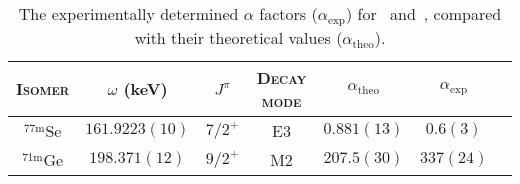 \begin{table}[hbt]
  \centering
  \caption{The experimentally determined $\alpha$ factors ($\alpha_{\mathrm{exp}}$) for \, and \,, compared with their theoretical values ($\alpha_{\mathrm{theo}}$).}
  \label{tab:chap3:bareresults}
  \begin{tabular}{ccccccc}
  \toprule
  \toprule
  \textsc{Isomer} & $\omega$ (keV) & $J^{\pi}$  & \textsc{Decay mode} & $\alpha_{\mathrm{theo}}$ & $\alpha_{\mathrm{exp}}$ \\ 
  \midrule\midrule
  $^{77\mathrm{m}}\mathrm{Se}$ & $161.9223(10)$ & $7/2 ^+$   & E3 & $0.881(13)$ & $0.6(3) $\\
  $^{71\mathrm{m}}\mathrm{Ge}$ & $198.371(12)$ & $9/2 ^+$  & M2 & $207.5(30)$ & $337(24)$  \\
  \bottomrule
  \bottomrule
  \end{tabular}
\end{table}


\begin{center}
  \vspace*{1cm}
  \vspace*{\fill}
\end{center}